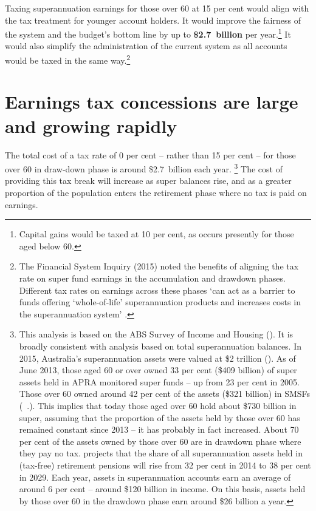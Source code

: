 Taxing superannuation earnings for those over 60 at 15 per cent would align with the tax treatment for younger account holders. It would improve the fairness of the system and the budget’s bottom line by up to \textbf{\$2.7~billion} per year.\footnote{Capital gains would be taxed at 10 per cent, as occurs presently for those aged below 60.}  It would also simplify the administration of the current system as all accounts would be taxed in the same way.\footnote{The \textcite[][140]{FinancialSystemsInquiry2015} Financial System Inquiry (2015) noted the benefits of aligning the tax rate on super fund earnings in the accumulation and drawdown phases. Different tax rates on earnings across these phases ‘can act as a barrier to funds offering ‘whole-of-life’ superannuation products and increases costs in the superannuation system’ \textcite[][140]{FinancialSystemsInquiry2015}. } 

%
\oneraggedpage
\section{Earnings tax concessions are large and growing rapidly}\label{sec:SUPER-6-1}
The total cost of a tax rate of 0 per cent – rather than 15 per cent – for those over 60 in draw-down phase is around \$2.7~billion each year.%
\footnote{This analysis is based on the ABS Survey of Income and Housing (\textcite{ABS2015-Survey-of-income-and-housing-2013-14}). It is broadly consistent with analysis based on total superannuation balances. In 2015, Australia’s superannuation assets were valued at \$2 trillion (\textcites[][6]{APRA2015JuneSuperPerformance}[][7]{MinifieSavageCameron2015}). As of June 2013, those aged 60 or over owned 33 per cent (\$409 billion) of super assets held in APRA monitored super funds – up from 23 per cent in 2005. Those over 60 owned around 42 per cent of the assets (\$321 billion) in SMSFs (\gao\ \textcite{ATO2014e}.). This implies that today those aged over 60 hold about \$730 billion in super, assuming that the proportion of the assets held by those over 60 has remained constant since 2013 – it has probably in fact increased. About 70 per cent of the assets owned by those over 60 are in drawdown phase where they pay no tax. \textcite[][23]{RiceWarner2015SubmissionTaxWhitePaper} projects that the share of all superannuation assets held in (tax-free) retirement pensions will rise from 32 per cent in 2014 to 38 per cent in 2029. Each year, assets in superannuation accounts earn an average of around 6 per cent – around \$120 billion in income. On this basis, assets held by those over 60 in the drawdown phase earn around \$26 billion a year.}  The cost of providing this tax break will increase as super balances rise, and as a greater proportion of the population enters the retirement phase where no tax is paid on earnings. 

